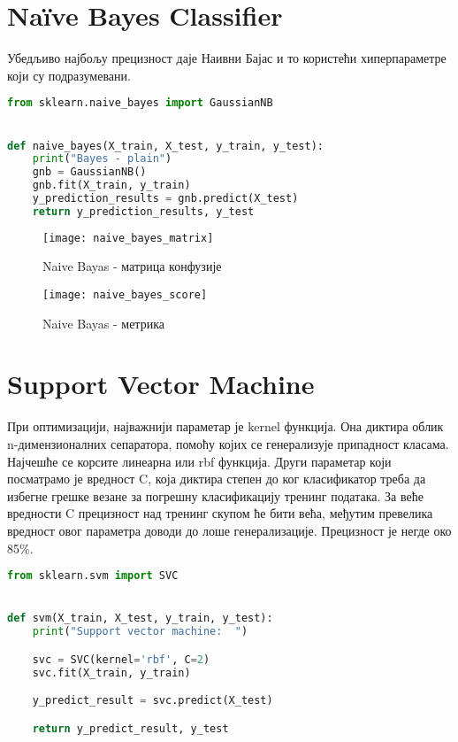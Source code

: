 \documentclass[11pt]{article} %
\begin{document}
\section{Naïve Bayes Classifier}
Убедљиво најбољу прецизност даје Наивни Бајас и то користећи хиперпараметре који су подразумевани.

\begin{lstlisting}[language=Python,title=Пример 7. Наивни бајес - код]
from sklearn.naive_bayes import GaussianNB


def naive_bayes(X_train, X_test, y_train, y_test):
    print("Bayes - plain")
    gnb = GaussianNB()
    gnb.fit(X_train, y_train)
    y_prediction_results = gnb.predict(X_test)
    return y_prediction_results, y_test
\end{lstlisting}

\begin{figure}[h]
\centering
	\texttt{[image: naive\_bayes\_matrix]} 
	\caption{Naive Bayas - матрица конфузије} 
\end{figure}

\begin{figure}[h]
\centering
	\texttt{[image: naive\_bayes\_score]} 
	\caption{Naive Bayas - метрика} 
\end{figure}

\newpage
\section{Support Vector Machine}
При оптимизацији, најважнији параметар је kernel функција. Она диктира облик n-димензионалних сепаратора, помоћу којих се генерализује припадност класама. Најчешће се корсите линеарна или rbf функција. Други параметар који посматрамо је вредност C, која диктира степен до ког класификатор треба да избегне грешке везане за погрешну класификацију тренинг података. За веће вредности C прецизност над тренинг скупом ће бити већа, међутим превелика вредност овог параметра доводи до лоше генерализације.
	Прецизност је негде око 85\%.


\begin{lstlisting}[language=Python,title=Пример 8. /classifers/svm.py]
from sklearn.svm import SVC


def svm(X_train, X_test, y_train, y_test):
    print("Support vector machine:  ")

    svc = SVC(kernel='rbf', C=2)
    svc.fit(X_train, y_train)

    y_predict_result = svc.predict(X_test)

    return y_predict_result, y_test
\end{lstlisting}
\end{document}
